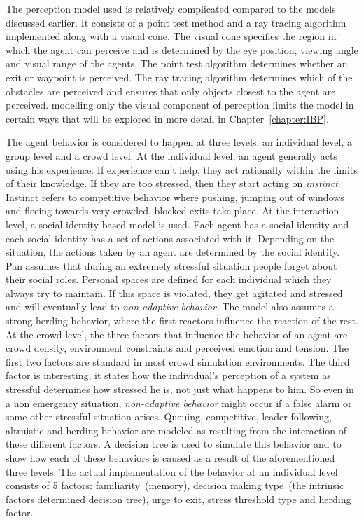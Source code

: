 The perception model used is relatively complicated compared to the models discussed earlier. It consists of a point test method and a ray tracing algorithm implemented along with a visual cone. The visual cone specifies the region in which the agent can perceive and is determined by the eye position, viewing angle and visual range of the agents. The point test algorithm determines whether an exit or waypoint is perceived. The ray tracing algorithm determines which of the obstacles are perceived and ensures that only objects closest to the agent are perceived. modelling only the visual component of perception limits the model in certain ways that will be explored in more detail in Chapter~\ref{chapter:IBP}.

The agent behavior is considered to happen at three levels: an individual level, a group level and a crowd level. At the individual level, an agent generally acts using his experience. If experience can't help, they act rationally within the limits of their knowledge. If they are too stressed, then they start acting on \emph{instinct}. Instinct refers to competitive behavior where pushing, jumping out of windows and fleeing towards very crowded, blocked exits take place. At the interaction level, a social identity based model is used. Each agent has a social identity and each social identity has a set of actions associated with it. Depending on the situation, the actions taken by an agent are determined by the social identity. Pan assumes that during an extremely stressful situation people forget about their social roles. Personal spaces are defined for each individual which they always try to maintain. If this space is violated, they get agitated and stressed and will eventually lead to \emph{non-adaptive behavior}. The model also assumes a strong herding behavior, where the first reactors influence the reaction of the rest. At the crowd level, the three factors that influence the behavior of an agent are crowd density, environment constraints and perceived emotion and tension. The first two factors are standard in most crowd simulation environments. The third factor is interesting, it states how the individual's perception of a system as stressful determines how stressed he is, not just what happens to him. So even in a non emergency situation, \emph{non-adaptive behavior} might occur if a false alarm or some other stressful situation arises. Queuing, competitive, leader following, altruistic and herding behavior are modeled as resulting from the interaction of these different factors. A decision tree is used to simulate this behavior and to show how each of these behaviors is caused as a result of the aforementioned three levels. The actual implementation of the behavior at an individual level consists of 5 factors: familiarity~(memory), decision making type~(the intrinsic factors determined decision tree), urge to exit, stress threshold type and herding factor.

